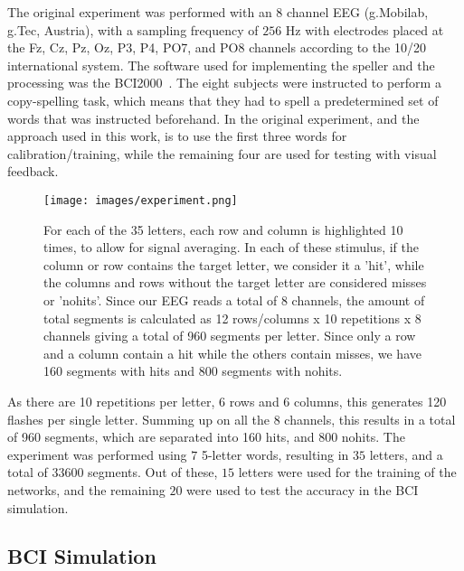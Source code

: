 \documentclass[conference]{IEEEtran}
\begin{document}
The original experiment was performed with an 8 channel EEG (g.Mobilab, g.Tec, Austria), with a sampling frequency of $256$ Hz with electrodes placed at the Fz, Cz, Pz, Oz, P3, P4, PO7, and PO8 channels according to the 10/20 international system. The software used for  implementing the speller and the processing was the BCI2000~\cite{schalk2004}. The eight subjects were instructed to perform a copy-spelling task, which means that they had to spell a predetermined set of words that was instructed beforehand.  In the original experiment, and the approach used in this work, is to use the first three words for calibration/training, while the remaining four are used for testing with visual feedback.


\begin{figure}[htbp]
\centerline{\texttt{[image: images/experiment.png]}}
\caption[Experimental protocol visualization]{For each of the 35 letters, each row and column is highlighted 10 times, to allow for signal averaging. In each of these stimulus, if the column or row contains the target letter, we consider it a 'hit', while the columns and rows without the target letter are considered misses or 'nohits'. Since our EEG reads a total of 8 channels, the amount of total segments is calculated as 12 rows/columns x 10 repetitions x 8 channels  giving a total of 960 segments per letter. Since only a row and a column contain a hit while the others contain misses, we have 160 segments with hits and 800 segments with nohits.}
\label{fig:datastructure}
\end{figure}

As there are 10 repetitions per letter, 6 rows and 6 columns, this generates 120 flashes per single letter.  Summing up on all the $8$ channels, this results in a total of 960 segments, which are separated into 160 hits, and 800 nohits.  The experiment was performed using $7$ 5-letter words, resulting in $35$ letters, and a total of $33600$ segments. Out of these, $15$ letters were used for the training of the networks, and the remaining $20$ were used to test the accuracy in the BCI simulation.


\subsection{BCI Simulation}
\end{document}
